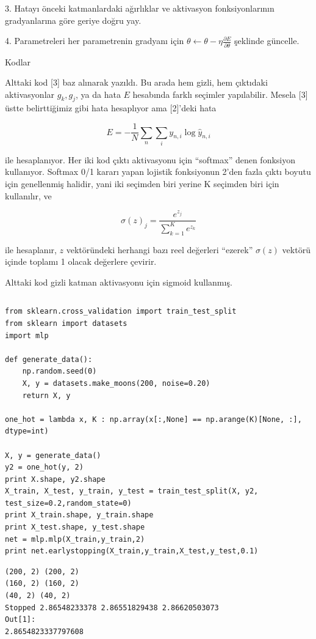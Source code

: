 \documentclass[12pt,fleqn]{article}\usepackage{../../common}
\begin{document}
3. Hatayı önceki katmanlardaki ağırlıklar ve aktivasyon fonksiyonlarının
gradyanlarına göre geriye doğru yay.

4. Parametreleri her parametrenin gradyanı için $\theta \leftarrow \theta -
\eta \frac{\partial E}{\partial \theta}$ şeklinde güncelle.

Kodlar

Alttaki kod [3] baz alınarak yazıldı. Bu arada hem gizli, hem çıktıdaki
aktivasyonlar $g_k,g_j$, ya da hata $E$ hesabında farklı seçimler
yapılabilir. Mesela [3] üstte belirttiğimiz gibi hata hesaplıyor ama
[2]'deki hata

$$ E = -\frac{1}{N} \sum_n \sum_i y_{n,i} \log \hat{y}_{n,i}$$

ile hesaplanıyor. Her iki kod çıktı aktivasyonu için ``softmax'' denen
fonksiyon kullanıyor. Softmax 0/1 kararı yapan lojistik fonksiyonun 2'den
fazla çıktı boyutu için genellenmiş halidir, yani iki seçimden biri yerine
K seçimden biri için kullanılır, ve

$$ \sigma(z)_j = \frac{e^{z_j}}{\sum_{k=1}^{K} e^{z_k}}$$

ile hesaplanır, $z$ vektöründeki herhangi bazı reel değerleri ``ezerek''
$\sigma(z)$ vektörü içinde toplamı 1 olacak değerlere çevirir. 

Alttaki kod gizli katman aktivasyonu için sigmoid kullanmış. 

\inputminted[fontsize=\footnotesize]{python}{mlp.py}

\begin{verbatim}
from sklearn.cross_validation import train_test_split
from sklearn import datasets
import mlp

def generate_data():
    np.random.seed(0)
    X, y = datasets.make_moons(200, noise=0.20)
    return X, y

one_hot = lambda x, K : np.array(x[:,None] == np.arange(K)[None, :], dtype=int)

X, y = generate_data()
y2 = one_hot(y, 2)
print X.shape, y2.shape
X_train, X_test, y_train, y_test = train_test_split(X, y2, test_size=0.2,random_state=0)
print X_train.shape, y_train.shape
print X_test.shape, y_test.shape
net = mlp.mlp(X_train,y_train,2)
print net.earlystopping(X_train,y_train,X_test,y_test,0.1)
\end{verbatim}

\begin{verbatim}
(200, 2) (200, 2)
(160, 2) (160, 2)
(40, 2) (40, 2)
Stopped 2.86548233378 2.86551829438 2.86620503073
Out[1]: 
2.8654823337797608
\end{verbatim}
\end{document}
